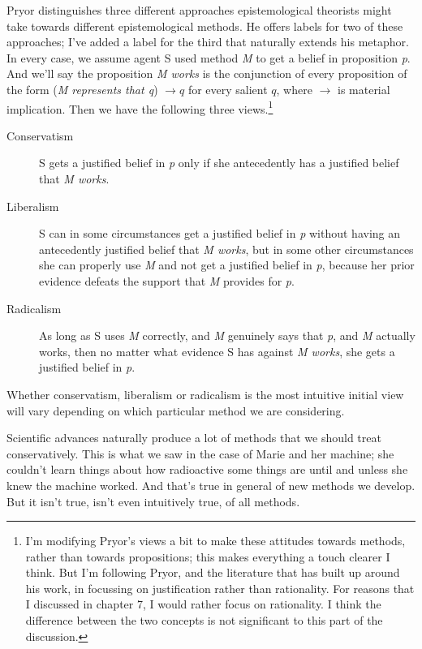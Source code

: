 Pryor distinguishes three different approaches epistemological theorists might take towards different epistemological methods. He offers labels for two of these approaches; I've added a label for the third that naturally extends his metaphor. In every case, we assume agent S used method \emph{M} to get a belief in proposition \emph{p}. And we'll say the proposition \emph{M works} is the conjunction of every proposition of the form (\emph{M represents that q}) $\rightarrow q$ for every salient $q$, where $\rightarrow$ is material implication. Then we have the following three views.\footnote{I'm modifying Pryor's views a bit to make these attitudes towards methods, rather than towards propositions; this makes everything a touch clearer I think. But I'm following Pryor, and the literature that has built up around his work, in focussing on justification rather than rationality. For reasons that I discussed in chapter 7, I would rather focus on rationality. I think the difference between the two concepts is not significant to this part of the discussion.}

\begin{description}
\item[Conservatism]

S gets a justified belief in \emph{p} only if she antecedently has a justified belief that \emph{M works}.

\item[Liberalism]

S can in some circumstances get a justified belief in \emph{p} without having an antecedently justified belief that \emph{M works}, but in some other circumstances she can properly use \emph{M} and not get a justified belief in \emph{p}, because her prior evidence defeats the support that \emph{M} provides for \emph{p}.

\item[Radicalism]

As long as S uses \emph{M} correctly, and \emph{M} genuinely says that \emph{p}, and \emph{M} actually works, then no matter what evidence S has against \emph{M works}, she gets a justified belief in \emph{p}.
\end{description}
Whether conservatism, liberalism or radicalism is the most intuitive initial view will vary depending on which particular method we are considering.

Scientific advances naturally produce a lot of methods that we should treat conservatively. This is what we saw in the case of \gls{Marie} and her machine; she couldn't learn things about how radioactive some things are until and unless she knew the machine worked. And that's true in general of new methods we develop. But it isn't true, isn't even intuitively true, of all methods.

